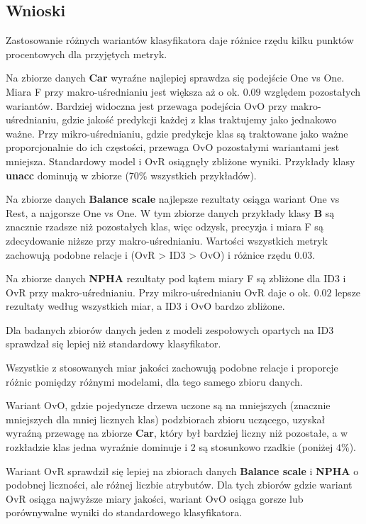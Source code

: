 \documentclass{article}
\begin{document}
\newpage
\subsection{Wnioski}
Zastosowanie różnych wariantów klasyfikatora daje różnice rzędu kilku punktów procentowych dla przyjętych metryk.

Na zbiorze danych \textbf{Car} wyraźne najlepiej sprawdza się podejście One vs One. Miara F przy makro-uśrednianiu jest większa aż o ok. $0.09$ względem pozostałych wariantów. Bardziej widoczna jest przewaga podejścia OvO przy makro-uśrednianiu, gdzie jakość predykcji każdej z klas traktujemy jako jednakowo ważne. Przy mikro-uśrednianiu, gdzie predykcje klas są traktowane jako ważne proporcjonalnie do ich częstości, przewaga OvO pozostałymi wariantami jest mniejsza.
Standardowy model i OvR osiągnęły zbliżone wyniki.
Przykłady klasy \textbf{unacc} dominują w zbiorze ($70\%$ wszystkich przykładów).

Na zbiorze danych \textbf{Balance scale} najlepsze rezultaty osiąga wariant One vs Rest, a najgorsze One vs One. W tym zbiorze danych przykłady klasy \textbf{B} są znacznie rzadsze niż pozostałych klas, więc odzysk, precyzja i miara F są zdecydowanie niższe przy makro-uśrednianiu.
Wartości wszystkich metryk zachowują podobne relacje i (OvR > ID3 > OvO) i różnice rzędu $0.03$.

Na zbiorze danych \textbf{NPHA} rezultaty pod kątem miary F są zbliżone dla ID3 i OvR przy makro-uśrednianiu.
Przy mikro-uśrednianiu OvR daje o ok. $0.02$ lepsze rezultaty według wszystkich miar, a ID3 i OvO bardzo zbliżone.

Dla badanych zbiorów danych jeden z modeli zespołowych opartych na ID3 sprawdzał się lepiej niż standardowy klasyfikator.

Wszystkie z stosowanych miar jakości zachowują podobne relacje i proporcje różnic pomiędzy różnymi modelami, dla tego samego zbioru danych.

Wariant OvO, gdzie pojedyncze drzewa uczone są na mniejszych (znacznie mniejszych dla mniej licznych klas) podzbiorach zbioru uczącego, uzyskał wyraźną przewagę na zbiorze \textbf{Car}, który był bardziej liczny niż pozostałe, a w rozkładzie klas jedna wyraźnie dominuje i 2 są stosunkowo rzadkie (poniżej $4\%$).

Wariant OvR sprawdził się lepiej na zbiorach danych \textbf{Balance scale} i \textbf{NPHA} o podobnej liczności, ale różnej liczbie atrybutów.
Dla tych zbiorów gdzie wariant OvR osiąga najwyższe miary jakości, wariant OvO osiąga gorsze lub porównywalne wyniki do standardowego klasyfikatora.
\end{document}
